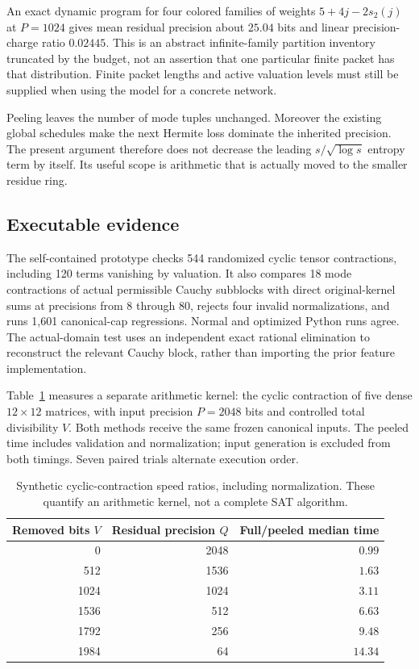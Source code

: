 An exact dynamic program for four colored families of weights
$5+4j-2s_2(j)$ at $P=1024$ gives mean residual precision about $25.04$
bits and linear precision-charge ratio $0.02445$. This is an abstract
infinite-family partition inventory truncated by the budget, not an
assertion that one particular finite packet has that distribution.
Finite packet lengths and active valuation levels must still be supplied
when using the model for a concrete network.

Peeling leaves the number of mode tuples unchanged. Moreover the existing
global schedules make the next Hermite loss dominate the inherited
precision. The present argument therefore does not decrease the leading
$s/\sqrt{\log s}$ entropy term by itself. Its useful scope is arithmetic
that is actually moved to the smaller residue ring.

\subsection{Executable evidence}

The self-contained prototype checks 544 randomized cyclic tensor
contractions, including 120 terms vanishing by valuation. It also compares
18 mode contractions of actual permissible Cauchy subblocks with direct
original-kernel sums at precisions from 8 through 80, rejects four invalid
normalizations, and runs 1,601 canonical-cap regressions. Normal and
optimized Python runs agree. The actual-domain test uses an independent
exact rational elimination to reconstruct the relevant Cauchy block,
rather than importing the prior feature implementation.

Table~\ref{tab:peeling-bench} measures a separate arithmetic kernel:
the cyclic contraction of five dense $12\times12$ matrices, with input
precision $P=2048$ bits and controlled total divisibility $V$.
Both methods receive the same frozen canonical inputs. The peeled time
includes validation and normalization; input generation is excluded from
both timings. Seven paired trials alternate execution order.

\begin{table}[htbp]\centering
\caption{Synthetic cyclic-contraction speed ratios, including normalization.
These quantify an arithmetic kernel, not a complete SAT algorithm.}
\label{tab:peeling-bench}
\begin{tabular}{@{}rrr@{}}\toprule
Removed bits $V$ & Residual precision $Q$ & Full/peeled median time\\\midrule
0 & 2048 & $0.99$\\
512 & 1536 & $1.63$\\
1024 & 1024 & $3.11$\\
1536 & 512 & $6.63$\\
1792 & 256 & $9.48$\\
1984 & 64 & $14.34$\\\bottomrule
\end{tabular}
\end{table}

